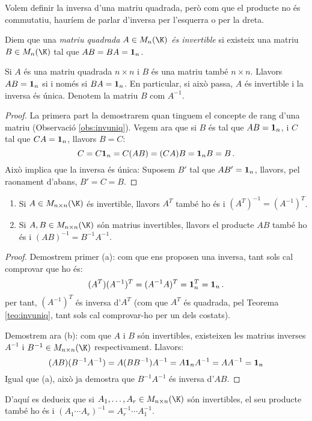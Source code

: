 Volem definir la inversa d'una matriu quadrada, però com que el producte no és commutatiu, hauríem de parlar d'inversa per l'esquerra o per la dreta.
\begin{definicio}
	Diem que una \emph{matriu quadrada $A \in M_{n}(\K)$ és invertible} si existeix una matriu $B \in M_n(\K)$ tal que $AB=BA=\mathbf{1}_n$.\\
\end{definicio}
\begin{teorema}\label{teo:invuniq}
	Si $A$ és una matriu quadrada $n\times n$ i $B$ és una matriu també $n\times n$. Llavors $AB=\mathbf{1}_n$ si i només si $BA=\mathbf{1}_n$. En particular, si això passa, $A$ és invertible i la inversa és única. Denotem la matriu $B$ com $A^{-1}$.
\end{teorema}
\begin{proof}
	La primera part la demostrarem quan tinguem el concepte de rang d'una matriu (Observació \ref{obs:invuniq}). Vegem ara que si $B$ és tal que $AB=\mathbf{1}_n$, i $C$ tal que $CA=\mathbf{1}_n$, llavors $B=C$:
	$$
	C = C \mathbf{1}_n = C(AB)=(CA)B=\mathbf{1}_n B=B \,.
	$$
	Això implica que la inversa és única: Suposem $B'$ tal que $AB'=\mathbf{1}_n$, llavors, pel raonament d'abans, $B'=C=B$.
\end{proof}
\begin{proposicio}
	\begin{enumerate}[\rm (a)]
		\item Si $A \in M_{n\times n}(\K)$ és invertible, llavors $A^T$ també ho és i $(A^T)^{-1}=(A^{-1})^T$.
		\item Si $A,B \in M_{n\times n}(\K)$ són matrius invertibles, llavors el producte $AB$ també ho és i $(AB)^{-1}=B^{-1}A^{-1}$.
	\end{enumerate}
\end{proposicio}
\begin{proof}
	Demostrem primer (a): com que ens proposen una inversa, tant sols cal comprovar que ho és:
	$$
	(A^T)(A^{-1})^T=(A^{-1}A)^T=\mathbf{1}_n^T=\mathbf{1}_n \,.
	$$
	per tant, $(A^{-1})^T$ és inversa d'$A^T$ (com que $A^T$ és quadrada, pel Teorema \ref{teo:invuniq}, tant sols cal comprovar-ho per un dels costats).
	
	Demostrem ara (b): com que $A$ i $B$ són invertibles, existeixen les matrius inverses $A^{-1}$ i $B^{-1}\in M_{n\times n}(\K)$ respectivament. Llavors:
	$$
	(AB)(B^{-1}A^{-1})=A(BB^{-1})A^{-1}=A\mathbf{1}_n A^{-1}=A A^{-1}=\mathbf{1}_n
	$$
	Igual que (a), això ja demostra que $B^{-1}A^{-1}$ és inversa d'$AB$.
\end{proof}
\begin{observacio}
	D'aquí es dedueix que si $A_1, \dots, A_r \in M_{n\times n}(\K)$ són invertibles, el seu producte també ho és i $(A_1\cdots A_r)^{-1}=A_r^{-1}\cdots A_1^{-1}$.
\end{observacio}
